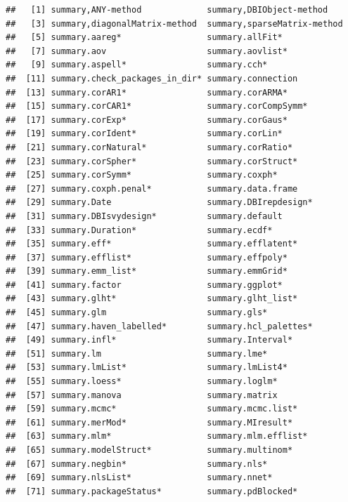\documentclass[
]{book}
\begin{document}
\begin{verbatim}
##   [1] summary,ANY-method             summary,DBIObject-method      
##   [3] summary,diagonalMatrix-method  summary,sparseMatrix-method   
##   [5] summary.aareg*                 summary.allFit*               
##   [7] summary.aov                    summary.aovlist*              
##   [9] summary.aspell*                summary.cch*                  
##  [11] summary.check_packages_in_dir* summary.connection            
##  [13] summary.corAR1*                summary.corARMA*              
##  [15] summary.corCAR1*               summary.corCompSymm*          
##  [17] summary.corExp*                summary.corGaus*              
##  [19] summary.corIdent*              summary.corLin*               
##  [21] summary.corNatural*            summary.corRatio*             
##  [23] summary.corSpher*              summary.corStruct*            
##  [25] summary.corSymm*               summary.coxph*                
##  [27] summary.coxph.penal*           summary.data.frame            
##  [29] summary.Date                   summary.DBIrepdesign*         
##  [31] summary.DBIsvydesign*          summary.default               
##  [33] summary.Duration*              summary.ecdf*                 
##  [35] summary.eff*                   summary.efflatent*            
##  [37] summary.efflist*               summary.effpoly*              
##  [39] summary.emm_list*              summary.emmGrid*              
##  [41] summary.factor                 summary.ggplot*               
##  [43] summary.glht*                  summary.glht_list*            
##  [45] summary.glm                    summary.gls*                  
##  [47] summary.haven_labelled*        summary.hcl_palettes*         
##  [49] summary.infl*                  summary.Interval*             
##  [51] summary.lm                     summary.lme*                  
##  [53] summary.lmList*                summary.lmList4*              
##  [55] summary.loess*                 summary.loglm*                
##  [57] summary.manova                 summary.matrix                
##  [59] summary.mcmc*                  summary.mcmc.list*            
##  [61] summary.merMod*                summary.MIresult*             
##  [63] summary.mlm*                   summary.mlm.efflist*          
##  [65] summary.modelStruct*           summary.multinom*             
##  [67] summary.negbin*                summary.nls*                  
##  [69] summary.nlsList*               summary.nnet*                 
##  [71] summary.packageStatus*         summary.pdBlocked*            

\end{verbatim}
\end{document}
